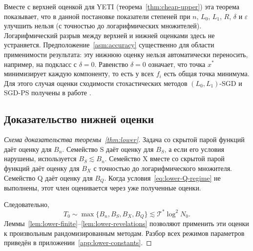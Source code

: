 Вместе с верхней оценкой для YETI (теорема~\ref{thm:cheap-upper})
эта теорема показывает, что в данной постановке показатели степеней
при $n$, $L_0$, $L_1$, $R$, $\delta$ и $\varepsilon$ улучшить нельзя
(с точностью до логарифмических множителей). Логарифмический разрыв между верхней и нижней оценками
здесь не устраняется. Предположение~\ref{asm:accuracy} существенно для области
применимости результата: эту нижнюю оценку нельзя автоматически
переносить, например, на подкласс с $\delta=0$. Равенство $\delta=0$ означает,
что точка $x^\ast$ минимизирует каждую компоненту, то есть у всех $f_i$ есть
общая точка минимума. Для этого случая оценки сходимости стохастических
методов $(L_0,L_1)$-SGD и SGD-PS получены в работе
\citet[раздел~7]{gorbunov2024methods}.

\subsection{Доказательство нижней оценки}

\begin{proof}[Схема доказательства теоремы~\ref{thm:lower}]
Задача со скрытой парой функций даёт оценку для $B_n$.
Семейство S даёт оценку для $B_S$, а если его условия
нарушены, используется $B_S\lesssim B_n$.
Семейство X вместе со скрытой парой функций даёт оценку для $B_X$
с точностью до логарифмического множителя. Семейство Q даёт оценку для
$B_Q$. Когда условия~\eqref{eq:lower-Q-regime} не выполнены,
этот член оценивается через уже полученные оценки.

Следовательно,
\[
 T_0\sim\max\{B_n,B_S,B_X,B_Q\}
 \lesssim\mathcal T^\ast\log^2N_0.
\]
Леммы~\ref{lem:lower-finite}--\ref{lem:lower-revelations}
позволяют применить эти оценки к произвольным рандомизированным
методам. Разбор всех режимов параметров приведён
в приложении~\ref{app:lower-constants}.
\end{proof}
